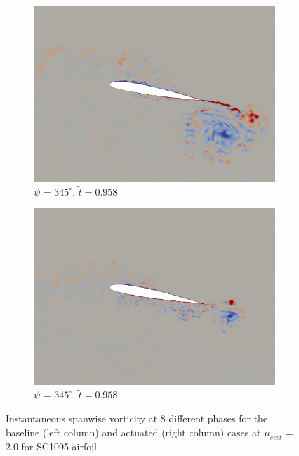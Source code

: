 \begin{figure}[H]
	\begin{subfigure}[b]{0.4\textwidth}
		\centering
		\includegraphics[width=1\textwidth]{figures/SC1095/baseline/phase_345.png}
		\caption{ $\psi$ = $345^\circ$, $\tilde{t}=0.958$}
		\label{fig:SC1095_baseline_psi345}
	\end{subfigure}
	\begin{subfigure}[b]{0.4\textwidth}
		\centering
		\includegraphics[width=1\textwidth]{figures/SC1095/AC/phase_345.png}
		\caption{ $\psi$ = $345^\circ$, $\tilde{t}=0.958$}
		\label{fig:SC1095_AC_psi345}
	\end{subfigure}
	
	
	
	\caption{Instantaneous spanwise vorticity at 8 different phases for the baseline (left column) and actuated (right column) cases at $\mu_{sect}$ = 2.0 for SC1095 airfoil}
	\label{fig:vortScreen_mu2pt0_SC1095}
\end{figure}

